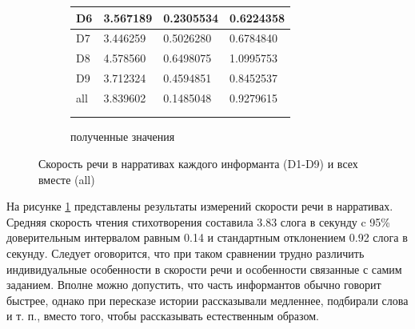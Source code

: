 \begin{figure}[t]
\begin{subfigure}[b]{0.45\textwidth}
\begin{tabular}{|l|l|l|l|}
D6 & 3.567189 & 0.2305534 & 0.6224358 \\ \hline
D7 & 3.446259 & 0.5026280 & 0.6784840 \\ \hline
D8 & 4.578560 & 0.6498075 & 1.0995753 \\ \hline
D9 & 3.712324 & 0.4594851 & 0.8452537 \\ \hline
all & 3.839602 & 0.1485048 & 0.9279615 \\ \hline
\multicolumn{1}{c}{}&\multicolumn{1}{c}{}&\multicolumn{1}{c}{}&\multicolumn{1}{c}{}\\
\multicolumn{1}{c}{}&\multicolumn{1}{c}{}&\multicolumn{1}{c}{}&\multicolumn{1}{c}{}\\
\end{tabular}
\normalsize
\caption{полученные значения}        
\end{subfigure}
\caption{Скорость речи в нарративах каждого информанта (D1-D9) и всех вместе (all)}
\label{narativeboxplot}
\end{figure}
\par На рисунке \ref{narativeboxplot} представлены результаты измерений скорости речи в нарративах. Средняя скорость чтения стихотворения составила 3.83 слога в секунду c 95\% доверительным интервалом равным 0.14 и стандартным отклонением 0.92 слога в секунду. Следует оговорится, что при таком сравнении трудно различить индивидуальные особенности в скорости речи и особенности связанные с самим заданием. Вполне можно допустить, что часть информантов обычно говорит быстрее, однако при пересказе истории рассказывали медленнее, подбирали слова и т. п., вместо того, чтобы рассказывать естественным образом.
